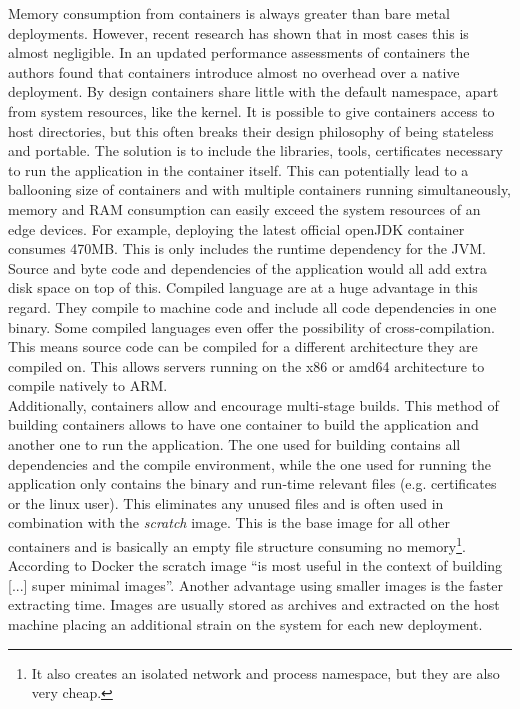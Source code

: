 Memory consumption from containers is always greater than bare metal deployments. However, recent research has shown that in most cases this is almost negligible. In an updated performance assessments of containers the authors found that containers introduce almost no overhead over a native deployment\cite{felter2015updatedPerformanceContainers}. By design containers share little with the default namespace, apart from system resources, like the kernel. It is possible to give containers access to host directories, but this often breaks their design philosophy of being stateless and portable. The solution is to include the libraries, tools, certificates necessary to run the application in the container itself. This can potentially lead to a ballooning size of containers and with multiple containers running simultaneously, memory and RAM consumption can easily exceed the system resources of an edge devices. For example, deploying the latest official openJDK container consumes 470MB. This is only includes the runtime dependency for the JVM. Source and byte code and dependencies of the application would all add extra disk space on top of this. Compiled language are at a huge advantage in this regard. They compile to machine code and include all code dependencies in one binary. Some compiled languages even offer the possibility of cross-compilation. This means source code can be compiled for a different architecture they are compiled on. This allows servers running on the x86 or amd64 architecture to compile natively to ARM.\\
Additionally, containers allow and encourage multi-stage builds. This method of building containers allows to have one container to build the application and another one to run the application. The one used for building contains all dependencies and the compile environment, while the one used for running the application only contains the binary and run-time relevant files (e.g. certificates or the linux user). This eliminates any unused files and is often used in combination with the \textit{scratch} image. This is the base image for all other containers and is basically an empty file structure consuming no memory\footnote{It also creates an isolated network and process namespace, but they are also very cheap.}. According to Docker the scratch image ``is most useful in the context of building [...] super minimal images''\cite{scratchImageDockerD65:online}. Another advantage using smaller images is the faster extracting time. Images are usually stored as archives and extracted on the host machine placing an additional strain on the system for each new deployment. \\[0.5mm]


